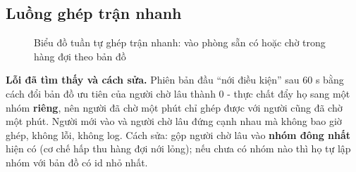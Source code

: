 \subsection{Luồng ghép trận nhanh}
\begin{figure}[H]
\centering
\renewcommand{\seqstep}{0.64cm}
\caption{Biểu đồ tuần tự ghép trận nhanh: vào phòng sẵn có hoặc chờ trong hàng đợi theo bản đồ}
\label{fig:D-luong-ghep}
\end{figure}

\textbf{Lỗi đã tìm thấy và cách sửa.} Phiên bản đầu ``nới điều kiện'' sau 60 s bằng cách đổi bản đồ ưu tiên của người
chờ lâu thành 0 - thực chất đẩy họ sang một nhóm \textbf{riêng}, nên người đã chờ một phút chỉ ghép được với người
cũng đã chờ một phút. Người mới vào và người chờ lâu đứng cạnh nhau mà không bao giờ ghép, không lỗi, không log. Cách
sửa: gộp người chờ lâu vào \textbf{nhóm đông nhất} hiện có (cơ chế hấp thu hàng đợi nới lỏng); nếu chưa có nhóm nào thì họ tự lập
nhóm với bản đồ có id nhỏ nhất.

